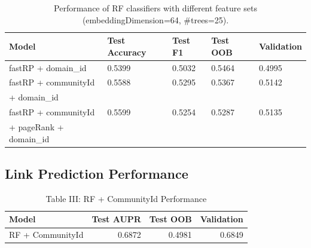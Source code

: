 \documentclass[conference]{IEEEtran}
\begin{document}
\begin{table}[htbp]
  \centering
  \begin{tabularx}{\linewidth}{lXXXX}
    \toprule
    \textbf{Model} & \textbf{Test Accuracy} & \textbf{Test F1} & \textbf{Test OOB} & \textbf{Validation} \\
    \midrule
    fastRP + domain\_id & 0.5399 & 0.5032 & 0.5464 & 0.4995 \\
    fastRP + communityId & 0.5588 & 0.5295 & 0.5367 & 0.5142 \\
    \quad + domain\_id & & & & \\
    fastRP + communityId & 0.5599 & 0.5254 & 0.5287 & 0.5135 \\
    \quad + pageRank + domain\_id & & & & \\
    \bottomrule
  \end{tabularx}
  \vspace{0.3cm}
  \caption{Performance of RF classifiers with different feature sets (embeddingDimension=64, \#trees=25).}
  \label{tab:performance}
\end{table}


\subsection{Link Prediction Performance}

\begin{table}[H]
\centering
\begin{tabular}{lrrr}
\toprule
\textbf{Model} & \textbf{Test AUPR} & \textbf{Test OOB} & \textbf{Validation} \\
\midrule
RF + CommunityId & 0.6872 & 0.4981 & 0.6849 \\
\bottomrule
\end{tabular}
\vspace{0.3cm}
\caption{Table III: RF + CommunityId Performance}
\end{table}

\end{document}
